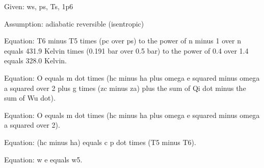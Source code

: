 Given: ws, ps, Ts, 1p6

Assumption: adiabatic reversible (isentropic)

Equation: 
T6 minus T5 times (pc over ps) to the power of n minus 1 over n equals 431.9 Kelvin times (0.191 bar over 0.5 bar) to the power of 0.4 over 1.4 equals 328.0 Kelvin.

Equation:
O equals m dot times (hc minus ha plus omega e squared minus omega a squared over 2 plus g times (zc minus za) plus the sum of Qi dot minus the sum of Wu dot).

Equation:
O equals m dot times (hc minus ha plus omega e squared minus omega a squared over 2).

Equation:
(hc minus ha) equals c p dot times (T5 minus T6).

Equation:
w e equals w5.